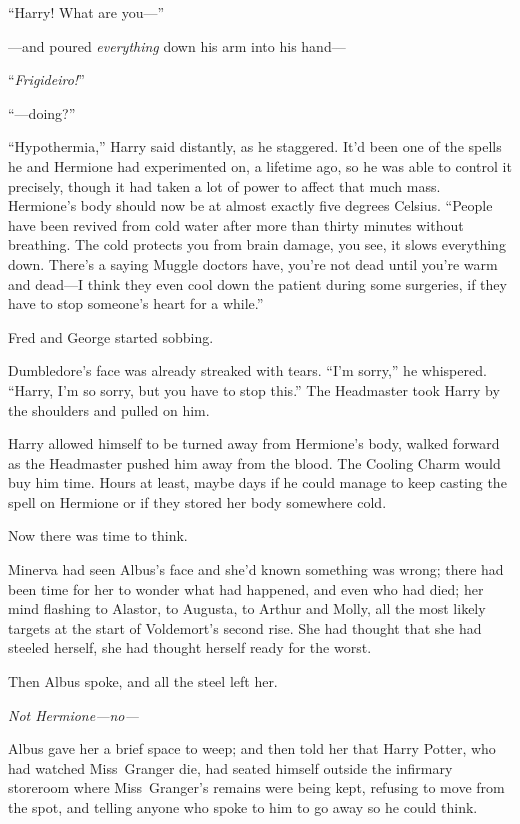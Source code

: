 “Harry! What are you—”

—and poured \emph{everything} down his arm into his hand—

“\emph{Frigideiro!}”

“—doing?”

“Hypothermia,” Harry said distantly, as he staggered. It’d been one of the spells he and Hermione had experimented on, a lifetime ago, so he was able to control it precisely, though it had taken a lot of power to affect that much mass. Hermione’s body should now be at almost exactly five degrees Celsius.
“People have been revived from cold water after more than thirty minutes without breathing. The cold protects you from brain damage, you see, it slows everything down. There’s a saying Muggle doctors have, you’re not dead until you’re warm and dead—I think they even cool down the patient during some surgeries, if they have to stop someone’s heart for a while.”

Fred and George started sobbing.

Dumbledore’s face was already streaked with tears.
“I’m sorry,” he whispered.
“Harry, I’m so sorry, but you have to stop this.” The Headmaster took Harry by the shoulders and pulled on him.

Harry allowed himself to be turned away from Hermione’s body, walked forward as the Headmaster pushed him away from the blood. The Cooling Charm would buy him time. Hours at least, maybe days if he could manage to keep casting the spell on Hermione or if they stored her body somewhere cold.

Now there was time to think.

\later

Minerva had seen Albus’s face and she’d known something was wrong; there had been time for her to wonder what had happened, and even who had died; her mind flashing to Alastor, to Augusta, to Arthur and Molly, all the most likely targets at the start of Voldemort’s second rise. She had thought that she had steeled herself, she had thought herself ready for the worst.

Then Albus spoke, and all the steel left her.

\emph{Not Hermione—no—}

Albus gave her a brief space to weep; and then told her that Harry Potter, who had watched Miss~Granger die, had seated himself outside the infirmary storeroom where Miss~Granger’s remains were being kept, refusing to move from the spot, and telling anyone who spoke to him to go away so he could think.

